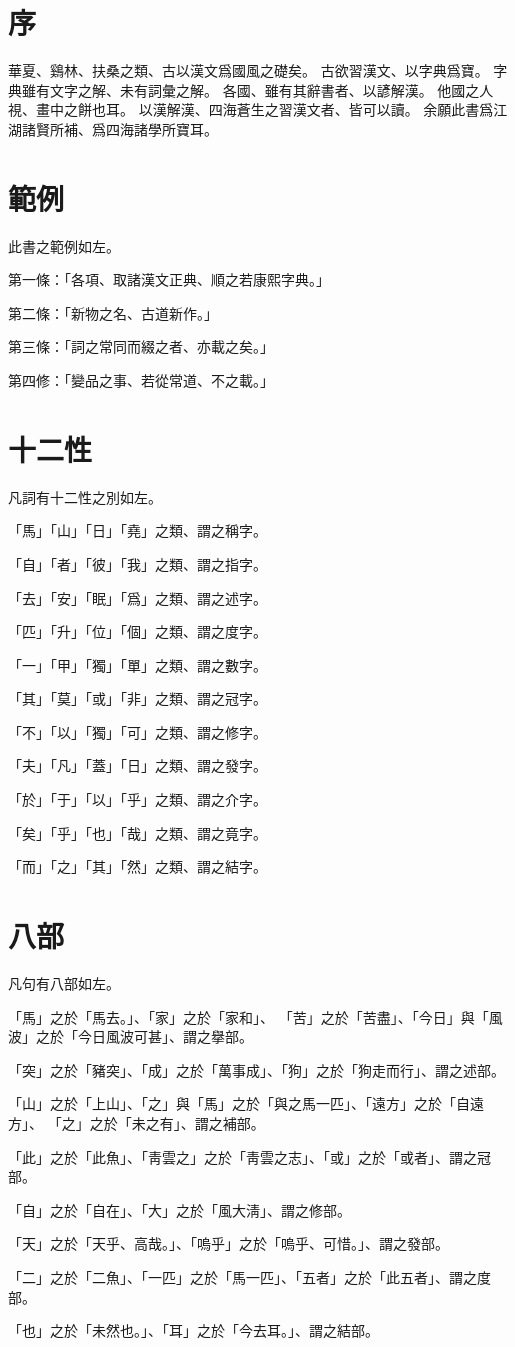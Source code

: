 \section{序}
華夏、鷄林、扶桑之類、古以漢文爲國風之礎矣。
古欲習漢文、以字典爲寶。
字典雖有文字之解、未有詞彙之解。
各國、雖有其辭書者、以諺解漢。
他國之人視、畫中之餅也耳。
以漢解漢、四海蒼生之習漢文者、皆可以讀。
余願此書爲江湖諸賢所補、爲四海諸學所寶耳。
\section{範例}
此書之範例如左。
\par 第一條：「各項、取諸漢文正典、順之若康熙字典。」
\par 第二條：「新物之名、古道新作。」
\par 第三條：「詞之常同而綴之者、亦載之矣。」
\par 第四修：「變品之事、若從常道、不之載。」
\section{十二性}
\par 凡詞有十二性之別如左。
\par 「馬」「山」「日」「堯」之類、謂之稱字。
\par 「自」「者」「彼」「我」之類、謂之指字。
\par 「去」「安」「眠」「爲」之類、謂之述字。
\par 「匹」「升」「位」「個」之類、謂之度字。
\par 「一」「甲」「獨」「單」之類、謂之數字。
\par 「其」「莫」「或」「非」之類、謂之冠字。
\par 「不」「以」「獨」「可」之類、謂之修字。
\par 「夫」「凡」「蓋」「日」之類、謂之發字。
\par 「於」「于」「以」「乎」之類、謂之介字。
\par 「矣」「乎」「也」「哉」之類、謂之竟字。
\par 「而」「之」「其」「然」之類、謂之結字。
\section{八部}
\par 凡句有八部如左。
\par 「馬」之於「馬去。」、「家」之於「家和」、
「苦」之於「苦盡」、「今日」與「風波」之於「今日風波可甚」、謂之擧部。
\par 「突」之於「豬突」、「成」之於「萬事成」、「狗」之於「狗走而行」、謂之述部。
\par 「山」之於「上山」、「之」與「馬」之於「與之馬一匹」、「遠方」之於「自遠方」、
「之」之於「未之有」、謂之補部。
\par 「此」之於「此魚」、「靑雲之」之於「靑雲之志」、「或」之於「或者」、謂之冠部。
\par 「自」之於「自在」、「大」之於「風大淸」、謂之修部。
\par 「天」之於「天乎、高哉。」、「嗚乎」之於「嗚乎、可惜。」、謂之發部。
\par 「二」之於「二魚」、「一匹」之於「馬一匹」、「五者」之於「此五者」、謂之度部。
\par 「也」之於「未然也。」、「耳」之於「今去耳。」、謂之結部。
